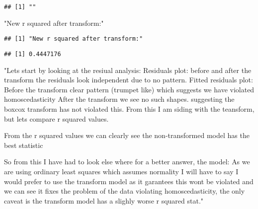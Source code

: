 \documentclass[
]{article}
\newenvironment{Shaded}{\begin{snugshade}}{\end{snugshade}}
\newcommand{\FunctionTok}[1]{\textcolor[rgb]{0.00,0.00,0.00}{#1}}
\newcommand{\NormalTok}[1]{#1}
\newcommand{\SpecialCharTok}[1]{\textcolor[rgb]{0.00,0.00,0.00}{#1}}
\newcommand{\StringTok}[1]{\textcolor[rgb]{0.31,0.60,0.02}{#1}}
\begin{document}
\begin{verbatim}
## [1] ""
\end{verbatim}

\begin{Shaded}
\begin{Highlighting}[]
\StringTok{"New r squared after transform:"}
\end{Highlighting}
\end{Shaded}

\begin{verbatim}
## [1] "New r squared after transform:"
\end{verbatim}

\begin{Shaded}
\end{Shaded}

\begin{verbatim}
## [1] 0.4447176
\end{verbatim}

\begin{Shaded}
\begin{Highlighting}[]
\StringTok{"Lets start by looking at the resiual analysis:}
\StringTok{Residuals plot: before and after the transform the residuals look independent due to no pattern.}
\StringTok{Fitted residuals plot: Before the transform clear pattern (trumpet like) which suggests we have violated homoscedasticity}
\StringTok{After the transform we see no such shapes. suggesting the boxcox transform has not violated this. From this I am siding with the teansform, but lets compare r squared values.}

\StringTok{From the r squared values we can clearly see the non{-}transformed model has the best statistic}

\StringTok{So from this I have had to look else where for a better answer, the model:}
\StringTok{As we are using ordinary least squares which assumes normality I will have to say I would prefer to use the transform model as it \textquotesingle{}garantees\textquotesingle{} this wont be violated and we can see it fixes the problem of the data violating homoscedasticity, the only caveat is the transform model has a slighly worse r squared stat."}
\end{Highlighting}
\end{Shaded}
\end{document}
